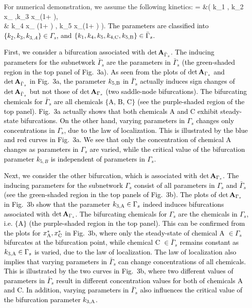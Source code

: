 \documentclass[ amsmath,amssymb,nofootinbib
]{revtex4-1}
\def\bal#1\eal{\begin{align}#1\end{align}}
\def\mbf#1{\mbox{\boldmath $#1$}}
\newcommand{\non}{\nonumber}
\newcommand{\detA}{{\rm det}\,  {\bf A}}
\newcommand{\gs}{{\Gamma_s}}
\newcommand{\gbs}{{\bar{\Gamma}_s}}
\newcommand{\red}[1]{\textcolor{black}{#1}}
\newcommand{\corr}[1]{\textcolor{black}{#1}}
\newcommand{\green}[1]{\textcolor{black}{#1}}
\begin{document}
For numerical demonstration, we assume the following kinetics:
\bal
{\mbf r} = &\biggl( k_1 , k_2 x_{} ,k_3  x_{}\left(1+ \right),\non \\
& k_4 x_{} \left(1+ \right) , k_5 x_{}\left(1+ \right)  \biggr).
\eal
\corr{The parameters are classified into $\{k_2, k_3, k_{3,A}\}\in \gs$, and  $\{k_1, k_4,k_5,k_{4,{\rm C}},k_{5,{\rm B}}\}\in \gbs$.}


\corr{First, we consider a bifurcation  associated with $\detA_{\bar\Gamma_s}$. The inducing parameters for the subnetwork $\gbs$  are the  parameters in ${\bar\Gamma}_s$ (the green-shaded region in the top panel of Fig.~3a). %
{As  seen from the plots of $\detA_{\Gamma_s}$ and $\detA_{\bar\Gamma_s}$ in Fig.~3a, the parameter  $k_{5,{\rm B}}$ in $\gbs$ actually induces  sign changes of $\detA_{\bar\Gamma_s}$ but not those of $\detA_{\Gamma_s}$ (two saddle-node bifurcations)}. The bifurcating chemicals for $\gbs$ are all chemicals $\{\text{A, B, C} \}$ (see the purple-shaded region of the top panel). Fig.~3a actually shows that both \red{chemicals} A and C exhibit steady-state bifurcations. 
On the other hand, varying  parameters in ${\Gamma_s}$ changes only concentrations in $\Gamma_s$, due to the law of localization. 
This is illustrated by  the blue and red curves in Fig.~3a.  %
We   see that only the concentration of chemical A changes as  parameters in ${\Gamma_s}$ are varied, while the critical value of the bifurcation parameter  $k_{5,B}$ is independent \red{of parameters in} ${\Gamma_s}$.}

\corr{
Next, we consider the other bifurcation, which is associated with $\detA_{\Gamma_s}$.
The inducing parameters for the subnetwork $\gs$ consist of all  parameters in  $\gs$ and $\gbs$ (see the green-shaded region in the top \red{panels of Fig.~3b)}. %
The plots \red{ of $\detA_{\Gamma_s}$ in Fig.~3b show that} the  parameter $k_{3,{\rm A}}\in \Gamma_s$ indeed induces bifurcations associated with $\detA_\gs$. 
The bifurcating chemicals for $\gs$ are  the chemicals in $\gs$, i.e. $\{\text{A}\} $ (the purple-shaded region in the top panel). This can be confirmed from  \red{the plots for $x^*_{\rm A}, x^*_{\rm C}$} in Fig.~3b, where  only the steady-state of chemical A $\in \gs$ bifurcates at the bifurcation point, while chemical C $\in \gbs$ remains constant   as $k_{3,{\rm A}}\in \gs$ is varied, \green{due to} the law of localization. 
The law of localization also implies that 
varying \red{parameters  in ${\bar\Gamma}_s$ can}
 change concentrations of all chemicals. This is illustrated by the two curves in Fig.~3b{, where two different values of parameters in ${\gbs}$ result in  different concentration values for both of chemicals A and C.}
\red{In addition,} varying parameters in  $\gbs$ also influences the critical value of the bifurcation parameter $k_{3,\rm A}$. 
}
\end{document}
